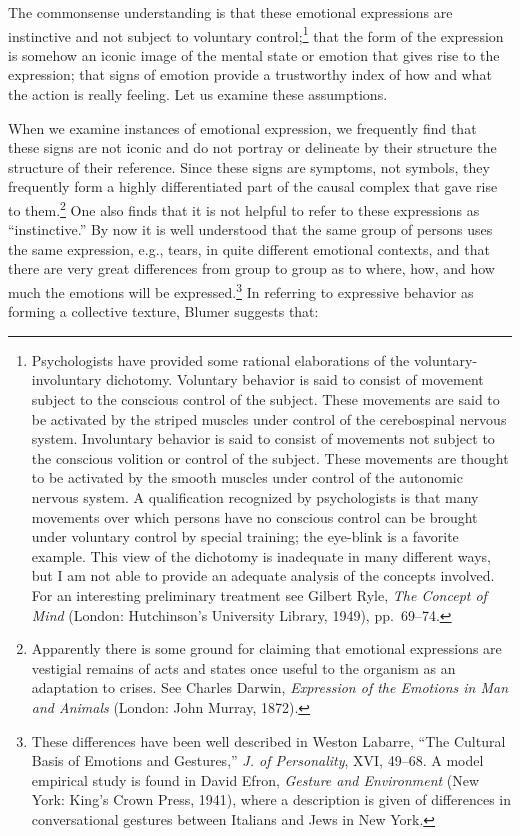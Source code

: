 \documentclass[openany,nobib]{tufte-book}
\begin{document}
\noindent The commonsense understanding is that these emotional expressions are
instinctive and not subject to voluntary control;\footnote{Psychologists
  have provided some rational elaborations of the voluntary-involuntary
  dichotomy. Voluntary behavior is said to consist of movement subject
  to the conscious control of the subject. These movements are said to
  be activated by the striped muscles under control of the cerebospinal
  nervous system. Involuntary behavior is said to consist of movements
  not subject to the conscious volition or control of the subject. These
  movements are thought to be activated by the smooth muscles under
  control of the autonomic nervous system. A qualification recognized by
  psychologists is that many movements over which persons have no
  conscious control can be brought under voluntary control by special
  training; the eye-blink is a favorite example. This view of the
  dichotomy is inadequate in many different ways, but I am not able to
  provide an adequate analysis of the concepts involved. For an
  interesting preliminary treatment see Gilbert Ryle, \emph{The Concept
  of Mind} (London: Hutchinson's University Library, 1949), pp.~69--74.}
that the form of the expression is somehow an iconic image of the mental
state or emotion that gives rise to the expression; that signs of
emotion provide a trustworthy index of how and what the action is really
feeling. Let us examine these assumptions.

When we examine instances of emotional expression, we frequently find
that these signs are not iconic and do not portray or delineate by their
structure the structure of their reference. Since these signs are
symptoms, not symbols, they frequently form a highly differentiated part
of the causal complex that gave rise to them.\footnote{Apparently there
  is some ground for claiming that emotional expressions are vestigial
  remains of acts and states once useful to the organism as an
  adaptation to crises. See Charles Darwin, \emph{Expression of the
  Emotions in Man and Animals} (London: John Murray, 1872).} One also
finds that it is not helpful to refer to these expressions as
``instinctive.'' By now it is well understood that the same group of
persons uses the same expression, e.g., tears, in quite different
emotional contexts, and that there are very great differences from group
to group as to where, how, and how much the emotions will be
expressed.\footnote{These differences have been well described in Weston
  Labarre, ``The Cultural Basis of Emotions and Gestures,'' \emph{J. of
  Personality}, XVI, 49--68. A model empirical study is found in David
  Efron, \emph{Gesture and Environment} (New York: King's Crown Press,
  1941), where a description is given of differences in conversational
  gestures between Italians and Jews in New York.} In referring to
expressive behavior as forming a collective texture, Blumer suggests
that:
\end{document}
